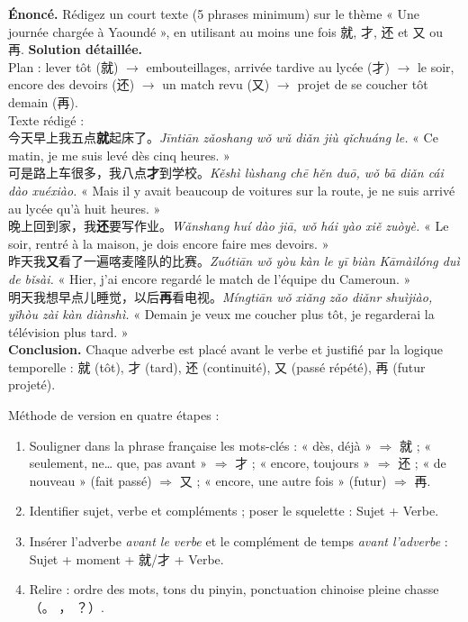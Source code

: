 \documentclass[11pt]{article}
\begin{document}
\begin{exoresolu}
\textbf{Énoncé.} Rédigez un court texte (5 phrases minimum) sur le thème « Une journée chargée à Yaoundé », en utilisant au moins une fois 就, 才, 还 et 又 ou 再.
\tcblower
\textbf{Solution détaillée.}\\
Plan : lever tôt (就) $\rightarrow$ embouteillages, arrivée tardive au lycée (才) $\rightarrow$ le soir, encore des devoirs (还) $\rightarrow$ un match revu (又) $\rightarrow$ projet de se coucher tôt demain (再).\\
Texte rédigé :\\
今天早上我五点\textbf{就}起床了。\emph{Jīntiān zǎoshang wǒ wǔ diǎn jiù qǐchuáng le.} « Ce matin, je me suis levé dès cinq heures. »\\
可是路上车很多，我八点\textbf{才}到学校。\emph{Kěshì lùshang chē hěn duō, wǒ bā diǎn cái dào xuéxiào.} « Mais il y avait beaucoup de voitures sur la route, je ne suis arrivé au lycée qu'à huit heures. »\\
晚上回到家，我\textbf{还}要写作业。\emph{Wǎnshang huí dào jiā, wǒ hái yào xiě zuòyè.} « Le soir, rentré à la maison, je dois encore faire mes devoirs. »\\
昨天我\textbf{又}看了一遍喀麦隆队的比赛。\emph{Zuótiān wǒ yòu kàn le yī biàn Kāmàilóng duì de bǐsài.} « Hier, j'ai encore regardé le match de l'équipe du Cameroun. »\\
明天我想早点儿睡觉，以后\textbf{再}看电视。\emph{Míngtiān wǒ xiǎng zǎo diǎnr shuìjiào, yǐhòu zài kàn diànshì.} « Demain je veux me coucher plus tôt, je regarderai la télévision plus tard. »\\
\textbf{Conclusion.} Chaque adverbe est placé avant le verbe et justifié par la logique temporelle : 就 (tôt), 才 (tard), 还 (continuité), 又 (passé répété), 再 (futur projeté).
\end{exoresolu}

\begin{methode}
Méthode de version en quatre étapes :
\begin{enumerate}
\item Souligner dans la phrase française les mots-clés : « dès, déjà » $\Rightarrow$ 就 ; « seulement, ne… que, pas avant » $\Rightarrow$ 才 ; « encore, toujours » $\Rightarrow$ 还 ; « de nouveau » (fait passé) $\Rightarrow$ 又 ; « encore, une autre fois » (futur) $\Rightarrow$ 再.
\item Identifier sujet, verbe et compléments ; poser le squelette : Sujet + Verbe.
\item Insérer l'adverbe \emph{avant le verbe} et le complément de temps \emph{avant l'adverbe} : Sujet + moment + 就/才 + Verbe.
\item Relire : ordre des mots, tons du pinyin, ponctuation chinoise pleine chasse （。 ， ？）.
\end{enumerate}
\end{methode}
\end{document}
